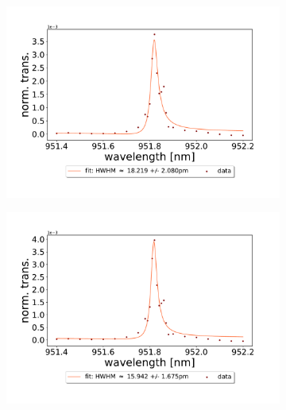 \begin{figure}[h!]
    \centering
    \begin{subfigure}[b]{0.49\textwidth}
        \includegraphics[width=\textwidth]{figures/results/single fano fits/120um_M5_fit_1.pdf}
        \caption{}
        \label{fig:120um_M5_fit_1}
    \end{subfigure}
    \begin{subfigure}[b]{0.49\textwidth}
        \includegraphics[width=\textwidth]{figures/results/single fano fits/120um_M5_fit_2.pdf}
        \caption{}
        \label{fig:120um_M5_fit_2}
    \end{subfigure}
    \begin{subfigure}[b]{0.49\textwidth}

\end{subfigure}
\end{figure}
